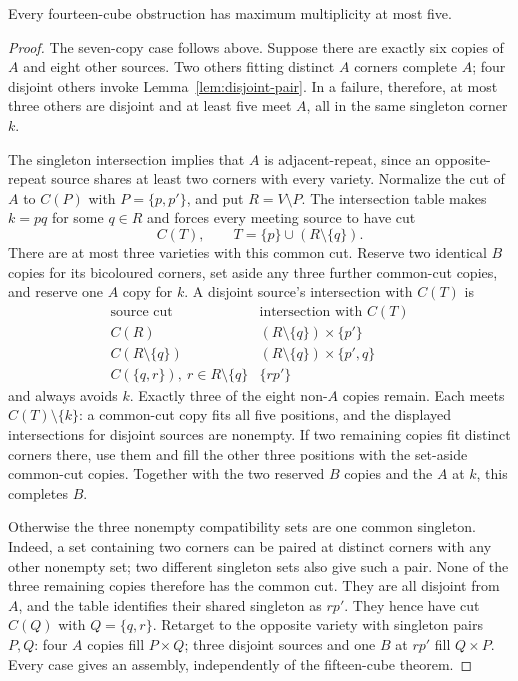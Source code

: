 \begin{theorem}\label{thm:multiplicity-five}
Every fourteen-cube obstruction has maximum multiplicity at most five.
\end{theorem}
\begin{proof}
The seven-copy case follows above. Suppose there are exactly six copies
of $A$ and eight other sources. Two others fitting distinct $A$ corners
complete $A$; four disjoint others invoke Lemma~\ref{lem:disjoint-pair}.
In a failure, therefore, at most three others are disjoint and at least
five meet $A$, all in the same singleton corner $k$.

The singleton intersection implies that $A$ is adjacent-repeat, since
an opposite-repeat source shares at least two corners with every variety.
Normalize the cut of $A$ to $C(P)$ with $P=\{p,p'\}$, and put $R=V\setminus P$.
The intersection table makes $k=pq$ for some $q\in R$ and forces every
meeting source to have cut
\[
 C(T),\qquad T=\{p\}\cup(R\setminus\{q\}).
\]
There are at most three varieties with this common cut. Reserve two
identical $B$ copies for its bicoloured corners, set aside any three further
common-cut copies, and reserve one $A$ copy for $k$. A disjoint source's
intersection with $C(T)$ is
\[
\begin{array}{c|c}
 \text{source cut}&\text{intersection with }C(T)\\\hline
 C(R)&(R\setminus\{q\})\times\{p'\}\\
 C(R\setminus\{q\})&(R\setminus\{q\})\times\{p',q\}\\
 C(\{q,r\}),\ r\in R\setminus\{q\}&\{rp'\}
\end{array}
\]
and always avoids $k$. Exactly three of the eight non-$A$ copies remain.
Each meets $C(T)\setminus\{k\}$: a common-cut copy fits all five positions,
and the displayed intersections for disjoint sources are nonempty.
If two remaining copies fit distinct corners there, use them and fill the
other three positions with the set-aside common-cut copies. Together with
the two reserved $B$ copies and the $A$ at $k$, this completes $B$.

Otherwise the three nonempty compatibility sets are one common singleton.
Indeed, a set containing two corners can be paired at distinct corners
with any other nonempty set; two different singleton sets also give such
a pair. None of the three remaining copies therefore has the common cut.
They are all disjoint from $A$, and the table identifies their shared singleton
as $rp'$. They hence have cut $C(Q)$ with $Q=\{q,r\}$. Retarget to the opposite
variety with singleton pairs $P,Q$: four $A$ copies fill $P\times Q$;
three disjoint sources and one $B$ at $rp'$ fill $Q\times P$.
Every case gives an assembly, independently of the fifteen-cube theorem.
\end{proof}


